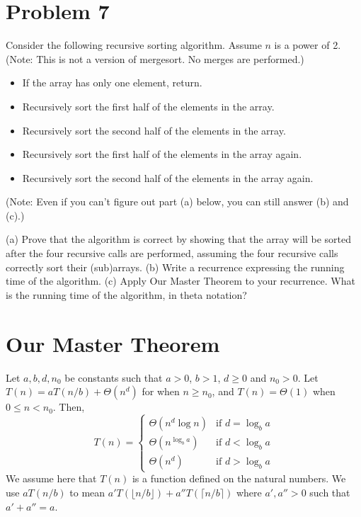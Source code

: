 \documentclass{article}
\begin{document}
\section*{Problem 7}
Consider the following recursive sorting algorithm. Assume $n$ is a power of 2. (Note: This is not a version of mergesort. No merges are performed.)
\begin{itemize}
    \item If the array has only one element, return.
    \item Recursively sort the first half of the elements in the array.
    \item Recursively sort the second half of the elements in the array.
    \item Recursively sort the first half of the elements in the array again.
    \item Recursively sort the second half of the elements in the array again.
\end{itemize}
(Note: Even if you can’t figure out part (a) below, you can still answer (b) and (c).)

(a)  Prove that the algorithm is correct by showing that the array will be sorted after the four recursive calls are performed, assuming the four recursive calls correctly sort their (sub)arrays.
(b) Write a recurrence expressing the running time of the algorithm.
(c) Apply Our Master Theorem to your recurrence. What is the running time of the algorithm, in theta notation?


\section*{Our Master Theorem}
\begin{theorem}
Let $a, b, d, n_0$ be constants such that $a > 0$, $b > 1$, $d \ge 0$ and $n_0 > 0$.
Let $T(n) = aT(n/b) + \Theta(n^d)$ for when $n \ge n_0$, and $T(n) = \Theta(1)$ when $0 \le n < n_0$. Then,
\[
T(n) = \begin{cases}
\Theta(n^d \log n) & \text{if } d = \log_b a \\
\Theta(n^{\log_b a}) & \text{if } d < \log_b a \\
\Theta(n^d) & \text{if } d > \log_b a
\end{cases}
\]
We assume here that $T(n)$ is a function defined on the natural numbers. We use $aT(n/b)$ to mean $a'T(\lfloor n/b \rfloor) + a''T(\lceil n/b \rceil)$ where $a', a'' > 0$ such that $a' + a'' = a$.
\end{theorem}
\end{document}
